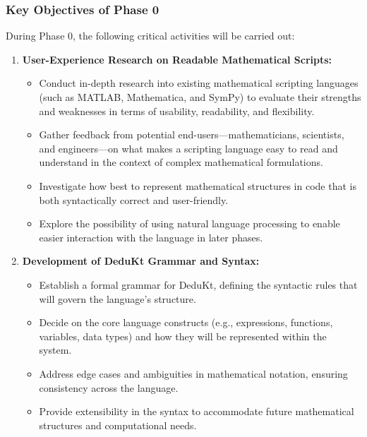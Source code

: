 \subsubsection{Key Objectives of Phase 0}
During Phase 0, the following critical activities will be carried out:
\begin{enumerate}
    \item \textbf{User-Experience Research on Readable Mathematical Scripts:}
    \begin{itemize}
        \item Conduct in-depth research into existing mathematical scripting languages (such as MATLAB, Mathematica, and SymPy) to evaluate their strengths and weaknesses in terms of usability, readability, and flexibility.
        \item Gather feedback from potential end-users—mathematicians, scientists, and engineers—on what makes a scripting language easy to read and understand in the context of complex mathematical formulations.
        \item Investigate how best to represent mathematical structures in code that is both syntactically correct and user-friendly.
        \item Explore the possibility of using natural language processing to enable easier interaction with the language in later phases.
    \end{itemize}

    \item \textbf{Development of DeduKt Grammar and Syntax:}
    \begin{itemize}
        \item Establish a formal grammar for DeduKt, defining the syntactic rules that will govern the language's structure.
        \item Decide on the core language constructs (e.g., expressions, functions, variables, data types) and how they will be represented within the system.
        \item Address edge cases and ambiguities in mathematical notation, ensuring consistency across the language.
        \item Provide extensibility in the syntax to accommodate future mathematical structures and computational needs.
    \end{itemize}


\end{enumerate}
